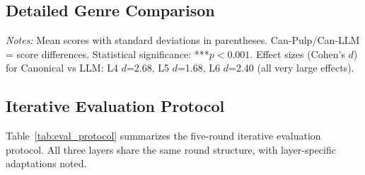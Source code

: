 \label{sec:appendix}

\subsection*{Detailed Genre Comparison}

\begin{table}[h]
\centering
\caption{Genre comparison across three analytical dimensions (detailed)}
\label{tab:genre_comparison_appendix}
\small
{}
\vspace{0.1cm}

\small
\textit{Notes:} Mean scores with standard deviations in parentheses. Can-Pulp/Can-LLM = score differences. Statistical significance: ***$p<0.001$. Effect sizes (Cohen's $d$) for Canonical vs LLM: L4 $d$=2.68, L5 $d$=1.68, L6 $d$=2.40 (all very large effects).
\end{table}

\subsection*{Iterative Evaluation Protocol}

Table~\ref{tab:eval_protocol} summarizes the five-round iterative evaluation protocol. All three layers share the same round structure, with layer-specific adaptations noted.

